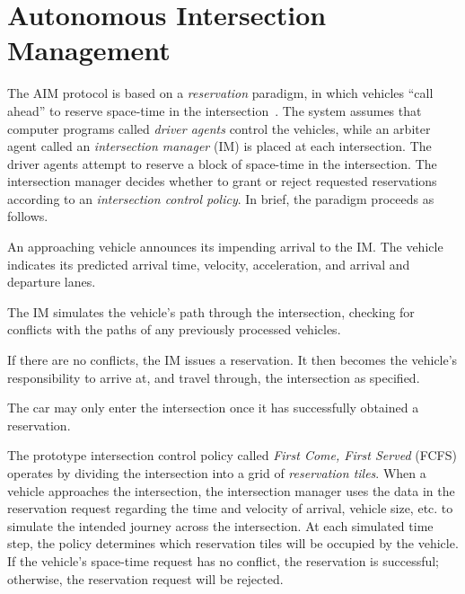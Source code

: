 \section{Autonomous Intersection Management}
\label{sec:aim}

The AIM protocol is based on a \emph{reservation} paradigm, in which
vehicles ``call ahead'' to reserve space-time in the
intersection~\cite{bib:Dresner08Multiagent}. The system assumes that
computer programs called \emph{driver agents} control the vehicles,
while an arbiter agent called an \emph{intersection manager} (IM) is
placed at each intersection.  The driver agents attempt to reserve a
block of space-time in the intersection.  The intersection manager
decides whether to grant or reject requested reservations according to
an \emph{intersection control policy}.  In brief, the paradigm
proceeds as follows.
\begin{small_ind_s_itemize}
\item An approaching vehicle announces its impending arrival to the
IM.  The vehicle indicates its predicted arrival time, velocity,
acceleration, and arrival and departure lanes.
\item The IM simulates the vehicle's path through
the intersection, checking for conflicts with the paths of any
previously processed vehicles.
\item If there are no conflicts, the IM issues a
reservation. It then becomes the vehicle's responsibility to arrive at, and
travel through, the intersection as specified.
\item The car may only enter the intersection once it has successfully
obtained a reservation.
\end{small_ind_s_itemize}
The prototype intersection control policy called \emph{First Come,
First Served} (FCFS) operates by dividing the intersection into a grid
of \emph{reservation tiles}. When a vehicle approaches the
intersection, the intersection manager uses the data in the
reservation request regarding the time and velocity of arrival,
vehicle size, etc. to simulate the intended journey across the
intersection.  At each simulated time step, the policy determines
which reservation tiles will be occupied by the vehicle.  If the
vehicle's space-time request has no conflict, the reservation is
successful; otherwise, the reservation request will be rejected.

